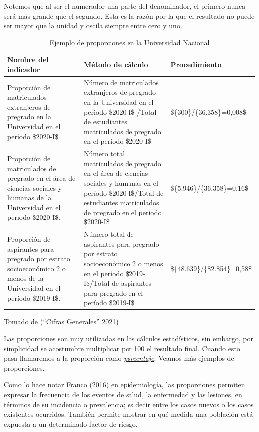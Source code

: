 \documentclass[
  11pt,
]{book}
\begin{document}
Notemos que al ser el numerador una parte del denominador, el primero
nunca será más grande que el segundo. Esta es la razón por la que el resultado no puede ser mayor que la unidad y oscila siempre entre cero y uno.

\begin{table}

\caption{\label{tab:unnamed-chunk-3}Ejemplo de proporciones en la Universidad Nacional}
\centering
\begin{tabular}[t]{l|l|l}
\hline
Nombre del indicador & Método de cálculo & Procedimiento\\
\hline
Proporción de matriculados extranjeros de pregrado en la Universidad en el período \$2020-I\$ & Número de  matriculados extranjeros de pregrado en la Universidad en el periodo \$2020-I\$ /Total de estudiantes matriculados de pregrado en el periodo \$2020-I\$ & \$\{300\}/\{36.358\}=0,008\$\\
\hline
Proporción de matriculados de pregrado en el área de ciencias sociales y humanas de la Universidad en el periodo \$2020-I\$. & Número total matriculados de pregrado en el área de ciencias sociales y humanas en el período \$2020-I\$/Total de estudiantes matriculados de pregrado en el período \$2020-I\$ & \$\{5.946\}/\{36.358\}=0,16\$\\
\hline
Proporción de aspirantes para pregrado por estrato socioeconómico 2 o menos de la Universidad en el período \$2019-I\$. & Número total de aspirantes para pregrado por estrato socioeconómico 2 o menos en el período \$2019-I\$/Total de aspirantes para pregrado en el período \$2019-I\$ & \$\{48.639\}/\{82.854\}=0,58\$\\
\hline
\end{tabular}
\end{table}

Tomado de (\protect\hyperlink{ref-BibEntry244021Mar}{{``Cifras Generales''} 2021})

Las proporciones son muy utilizadas en los cálculos estadísticos, sin embargo, por simplicidad se acostumbre multiplicar por 100 el resultado final. Cuando esto pasa llamaremos a la proporción como \protect\hyperlink{porcentaje}{\emph{porcentaje}}. Veamos más ejemplos de proporciones.

Como lo hace notar \protect\hyperlink{ref-franco2016estadistica}{Franco} (\protect\hyperlink{ref-franco2016estadistica}{2016}) en epidemiología, las proporciones permiten expresar la frecuencia de los eventos de salud, la enfermedad y las lesiones, en términos de su incidencia o prevalencia; es decir entre los casos nuevos o los casos existentes ocurridos. También permite mostrar en qué medida una población está expuesta a un
determinado factor de riesgo.
\end{document}
